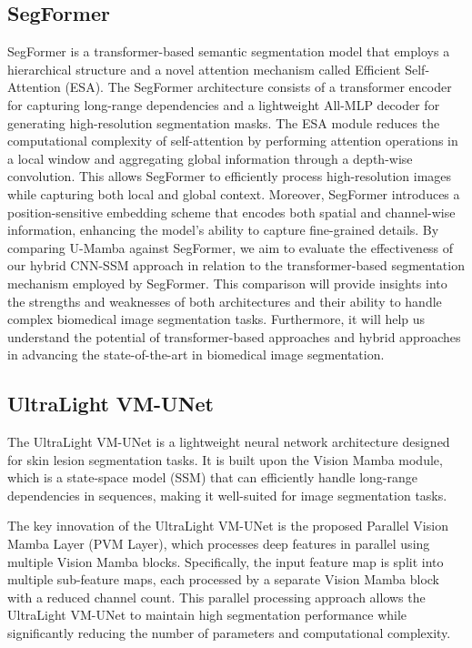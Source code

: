 \documentclass[conference]{IEEEtran}
\begin{document}
\subsection{SegFormer}
SegFormer \cite{xie2021segformer} is a transformer-based semantic segmentation model that employs a hierarchical structure and a novel attention mechanism called Efficient Self-Attention (ESA). The SegFormer architecture consists of a transformer encoder for capturing long-range dependencies and a lightweight All-MLP decoder for generating high-resolution segmentation masks. The ESA module reduces the computational complexity of self-attention by performing attention operations in a local window and aggregating global information through a depth-wise convolution. This allows SegFormer to efficiently process high-resolution images while capturing both local and global context. Moreover, SegFormer introduces a position-sensitive embedding scheme that encodes both spatial and channel-wise information, enhancing the model's ability to capture fine-grained details. By comparing U-Mamba against SegFormer, we aim to evaluate the effectiveness of our hybrid CNN-SSM approach in relation to the transformer-based segmentation mechanism employed by SegFormer. This comparison will provide insights into the strengths and weaknesses of both architectures and their ability to handle complex biomedical image segmentation tasks. Furthermore, it will help us understand the potential of transformer-based approaches and hybrid approaches in advancing the state-of-the-art in biomedical image segmentation.

\subsection{UltraLight VM-UNet}
The UltraLight VM-UNet \cite{ultralightvmunet} is a lightweight neural network architecture designed for skin lesion segmentation tasks. It is built upon the Vision Mamba module, which is a state-space model (SSM) that can efficiently handle long-range dependencies in sequences, making it well-suited for image segmentation tasks.

The key innovation of the UltraLight VM-UNet is the proposed Parallel Vision Mamba Layer (PVM Layer), which processes deep features in parallel using multiple Vision Mamba blocks. Specifically, the input feature map is split into multiple sub-feature maps, each processed by a separate Vision Mamba block with a reduced channel count. This parallel processing approach allows the UltraLight VM-UNet to maintain high segmentation performance while significantly reducing the number of parameters and computational complexity.
\end{document}
